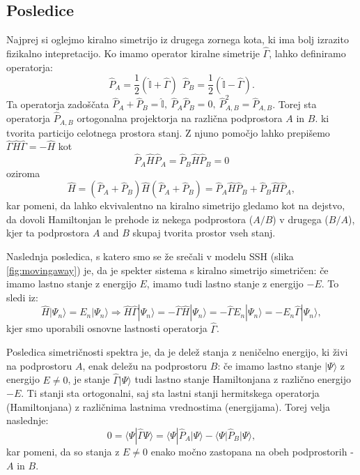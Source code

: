 \subsection{Posledice}
Najprej si oglejmo kiralno simetrijo iz drugega zornega kota, ki ima bolj izrazito fizikalno intepretacijo. Ko imamo operator kiralne simetrije $\hat{\Gamma}$, lahko definiramo operatorja:
\begin{equation}
\hat{P}_A = \frac{1}{2} ( \hat{\mathbb{I}} + \hat{\Gamma}) \ \ \hat{P}_B = \frac{1}{2} (\hat{\mathbb{I}} - \hat{\Gamma}).
\end{equation}
Ta operatorja zadoščata $\hat{P}_A + \hat{P}_B = \hat{\mathbb{I}},\  \hat{P}_A \hat{P}_B = 0,\  \hat{P}_{A,B}^2 = \hat{P}_{A,B}$. Torej sta operatorja $\hat{P}_{A,B}$ ortogonalna projektorja na različna podprostora $A$ in $B$. ki tvorita particijo celotnega prostora stanj.
Z njuno pomočjo lahko prepišemo $\hat{\Gamma} \hat{H} \hat{\Gamma} = -\hat{H}$ kot
\begin{equation}
\hat{P}_A \hat{H} \hat{P}_A = \hat{P}_B \hat{H} \hat{P}_B = 0
\end{equation}
oziroma
\begin{equation}
 \hat{H} = \left( \hat{P}_A + \hat{P}_B \right) \hat{H}  \left( \hat{P}_A + \hat{P}_B \right)  = \hat{P}_A \hat{H} \hat{P}_B + \hat{P}_B \hat{H} \hat{P}_A,
\end{equation}
kar pomeni, da lahko ekvivalentno na kiralno simetrijo gledamo kot na dejstvo, da dovoli Hamiltonjan le prehode iz nekega podprostora ($A/B$) v drugega ($B/A$), kjer ta podprostora $A$ and $B$ skupaj tvorita prostor vseh stanj.

Naslednja posledica, s katero smo se že srečali v modelu SSH (slika \ref{fig:movingaway}) je, da je spekter sistema s kiralno simetrijo simetričen: če imamo lastno stanje z energijo $E$, imamo tudi lastno stanje z energijo $-E$. To sledi iz:
\begin{equation}
\hat{H} | \Psi_n \rangle = E_n | \Psi_n \rangle  \Rightarrow \hat{H} \hat{\Gamma} |\Psi_n \rangle = - \hat{\Gamma} \hat{H} | \Psi_n \rangle = - \hat{\Gamma} E_n | \Psi_n \rangle = - E_n \hat{\Gamma} | \Psi_n \rangle,
\end{equation}
kjer smo uporabili osnovne lastnosti operatorja $\hat{\Gamma}$. 

Posledica simetričnosti spektra je, da je delež stanja z neničelno energijo, ki živi na podprostoru $A$, enak deležu na podprostoru $B$: če imamo lastno stanje $| \Psi \rangle$ z energijo $E \neq 0$, je stanje $\hat{\Gamma} | \Psi \rangle$ \label{spomnimo4} tudi lastno stanje Hamiltonjana z različno energijo $-E$. Ti stanji sta ortogonalni, saj sta lastni stanji hermitskega operatorja (Hamiltonjana) z različnima lastnima vrednostima (energijama). Torej velja naslednje:
\begin{equation}
0 = \langle \Psi | \hat{\Gamma}  \Psi \rangle = \langle \Psi | \hat{P}_A | \Psi \rangle - \langle \Psi | \hat{P}_B | \Psi \rangle,
\end{equation}
kar pomeni, da so stanja z $E \neq 0$ enako močno zastopana na obeh podprostorih - $A$ in $B$.


